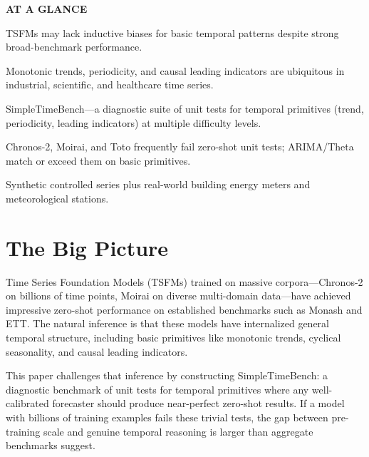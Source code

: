 \documentclass[10pt,twocolumn]{article}
\begin{document}
\begin{mdframed}[backgroundcolor=boxgray,linecolor=rulered,linewidth=1pt,
    innerleftmargin=6pt,innerrightmargin=6pt,
    innertopmargin=6pt,innerbottommargin=6pt]
\textbf{\small AT A GLANCE}\par\vspace{4pt}
\begin{description}[leftmargin=0pt,labelsep=4pt,itemsep=2pt,parsep=0pt,
    font=\small\bfseries]
  \item[Problem:] TSFMs may lack inductive biases for basic temporal patterns despite
    strong broad-benchmark performance.
  \item[Why it matters:] Monotonic trends, periodicity, and causal leading indicators
    are ubiquitous in industrial, scientific, and healthcare time series.
  \item[Method:] SimpleTimeBench---a diagnostic suite of unit tests for temporal
    primitives (trend, periodicity, leading indicators) at multiple difficulty levels.
  \item[Result:] Chronos-2, Moirai, and Toto frequently fail zero-shot unit tests;
    ARIMA/Theta match or exceed them on basic primitives.
  \item[Evidence:] Synthetic controlled series plus real-world building energy meters and
    meteorological stations.
\end{description}
\end{mdframed}

\section{The Big Picture}

Time Series Foundation Models (TSFMs) trained on massive corpora---Chronos-2 on
billions of time points, Moirai on diverse multi-domain data---have achieved
impressive zero-shot performance on established benchmarks such as Monash and ETT.
The natural inference is that these models have internalized general temporal structure,
including basic primitives like monotonic trends, cyclical seasonality, and causal
leading indicators.

This paper challenges that inference by constructing SimpleTimeBench: a diagnostic
benchmark of unit tests for temporal primitives where any well-calibrated forecaster
should produce near-perfect zero-shot results. If a model with billions of training
examples fails these trivial tests, the gap between pre-training scale and genuine
temporal reasoning is larger than aggregate benchmarks suggest.
\end{document}
